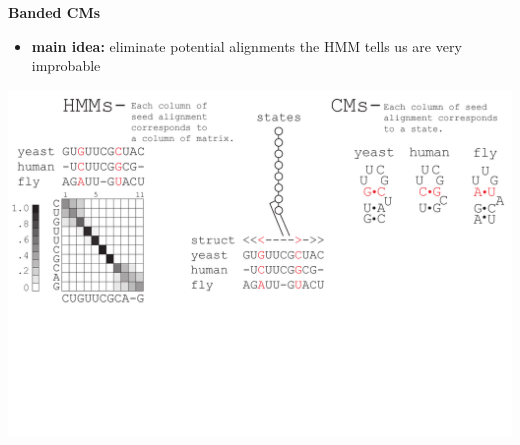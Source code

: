 \documentclass[landscape]{slides}
\begin{document}
\begin{slide}
\begin{center}
\large
\textbf{Banded CMs}
\end{center}
\medskip
\small
\begin{itemize}
\item
\textbf{main idea:} eliminate potential alignments the HMM tells us are very improbable
\end{itemize}
\begin{center}
\includegraphics[width=8in]{figs/post_hmm_to_cm_map2_layer4}
\end{center}
\vfill
\end{slide}
\end{document}
